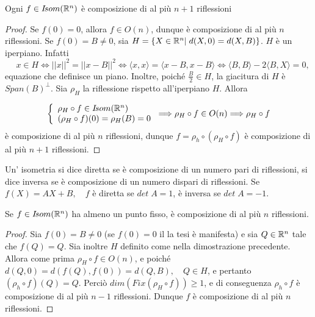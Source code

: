 \begin{theorem}
 Ogni $f\in I\!som( \mathbb R^n)$ è composizione di al più $n+1$ riflessioni
 \end{theorem}
 
 \begin{proof}
 Se $f(0)=0$, allora $f\in O(n)$, dunque è composizione di al più $n$ 
 riflessioni.
 Se $f(0)=B\ne 0$, sia $H=\{X\in \mathbb R^n|\;d(X,0)=d(X,B)\}$.
 $H$ è un iperpiano. Infatti 
 \[
  \quad x\in H\Longleftrightarrow ||x||^2=||x-B||^2\Longleftrightarrow\langle x,x\rangle=
 \langle x-B,x-B\rangle\Longleftrightarrow\langle B,B\rangle-2\langle B,X\rangle=0,
 \]
 equazione che definisce un piano. Inoltre, poiché $\frac{B}{2}\in H$, la giacitura di $H$ è 
 $Span(B)^{\bot}$.
 Sia $\rho_H$ la riflessione rispetto all'iperpiano $H$.
 Allora
 
 \[ \left\{
 \begin{array}{l}
  \rho_H\circ f\in I\!som( \mathbb R^n) \\
  (\rho_H\circ f)(0)=\rho_H(B)=0
 \end{array}
 \right.
 \Longrightarrow \rho_H\circ f\in O(n)\Longrightarrow \rho_H\circ f
 \]
 è composizione di al più $n$ riflessioni, dunque $f=\rho_h\circ(\rho_H\circ f)$
 è composizione di al più $n+1$ riflessioni.
  \end{proof}
 
 \begin{definition}Un' isometria si dice diretta se è composizione di un numero pari di riflessioni, si dice inversa se
 è composizione di un numero dispari di riflessioni. Se $f(X)=AX+B,\quad f$ è diretta se $det\; A=1$,
 è inversa se $det\; A=-1$.
 \end{definition}
 
 \begin{proposition}
 Se $f\in I\!som( \mathbb R^n)$ ha almeno un punto fisso, è composizione di al più $n$ riflessioni.
 \end{proposition}
 
 \begin{proof}
 Sia $f(0)=B\ne 0$ (se $f(0)=0$ il la tesi è manifesta) e sia $Q\in \mathbb R^n$
 tale che $f(Q)=Q$. Sia inoltre $H$ definito come nella dimostrazione precedente.
 Allora come prima $\rho_H\circ f\in O(n)$, e poiché $d(Q,0)=d(f(Q),f(0))=d(Q,B),\quad Q\in H$, e pertanto
 $(\rho_h\circ f)(Q)=Q$.
 Perciò $dim(Fix(\rho_H\circ f))\ge 1$, e di conseguenza $\rho_h\circ f$ è composizione di al più
 $n-1$
 riflessioni.
 Dunque $f$ è composizione di al più $n$ riflessioni.
  \end{proof}

